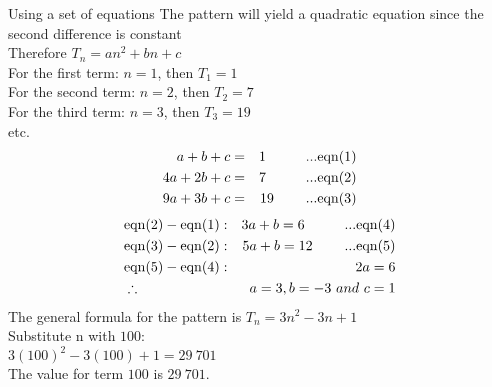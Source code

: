 \begin{wex}{Using a set of equations}
{The pattern will yield a quadratic equation since the second difference is
constant\\
Therefore $T_n = an^2 + bn + c$\\
For the first term: $n = 1$,  then $T_1 = 1$ \\
For the second term: $n = 2$, then $T_2 = 7$ \\  
For the third term:  $n = 3$,  then $T_3 = 19$ \\
etc.\\
\begin{eqnarray*}
a+b+c &=& 1 \hspace{1cm} \rm {...eqn} (1)\\
4a + 2b + c &=& 7 \hspace{1cm} \rm {...eqn} (2)\\
9a + 3b + c &=& 19 \hspace{0.8cm} \rm {...eqn} (3)
\end{eqnarray*}
\begin{eqnarray*}
&\rm{eqn} (2) - \rm{eqn} (1):& 3a + b = 6 \hspace{1cm} \rm {...eqn} (4)\\
&\rm{eqn} (3) - \rm{eqn} (2):& 5a + b = 12 \hspace{0.8cm} \rm {...eqn} (5)\\
&\rm{eqn} (5) - \rm{eqn} (4):& 2a = 6\\
&\therefore & a = 3, b = -3 ~and~ c = 1
\end{eqnarray*}
The general formula for the pattern is $T_n = 3n^2 - 3n + 1$\\
Substitute n with $100$:\\
$3(100)^2 - 3(100) + 1 = 29~701$\\
The value for term $100$ is $29~701$.
}
\end{wex}


